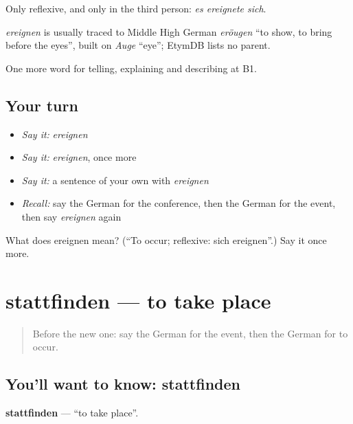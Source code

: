 Only reflexive, and only in the third person: \emph{es ereignete sich}.

\begin{cousinweb}
\emph{ereignen} is usually traced to Middle High German \emph{eröugen} \textquotedblleft{}to show, to bring before the eyes\textquotedblright{}, built on \emph{Auge} \textquotedblleft{}eye\textquotedblright{}; EtymDB lists no parent.
\end{cousinweb}

\begin{grammarlens}[title={What you've built}]
One more word for telling, explaining and describing at B1.
\end{grammarlens}

\subsection*{Your turn}
\begin{itemize}
\raggedright
  \item \emph{Say it:} \emph{ereignen}
  \item \emph{Say it:} \emph{ereignen}, once more
  \item \emph{Say it:} a sentence of your own with \emph{ereignen}
  \item \emph{Recall:} say the German for the conference, then the German for the event, then say \emph{ereignen} again
\end{itemize}

\begin{tcolorbox}[breakable,colback=teal!4,colframe=teal!35!black,title={Before you move on}]
What does ereignen mean? (\textquotedblleft{}To occur; reflexive: sich ereignen\textquotedblright{}.) Say it once more.
\end{tcolorbox}
\section[stattfinden]{stattfinden — to take place}

\label{lesson:GE-C279-stattfinden}



\begin{quote}
Before the new one: say the German for the event, then the German for to occur.
\end{quote}

\subsection*{You'll want to know: stattfinden}
\textbf{stattfinden} — \textquotedblleft{}to take place\textquotedblright{}.


